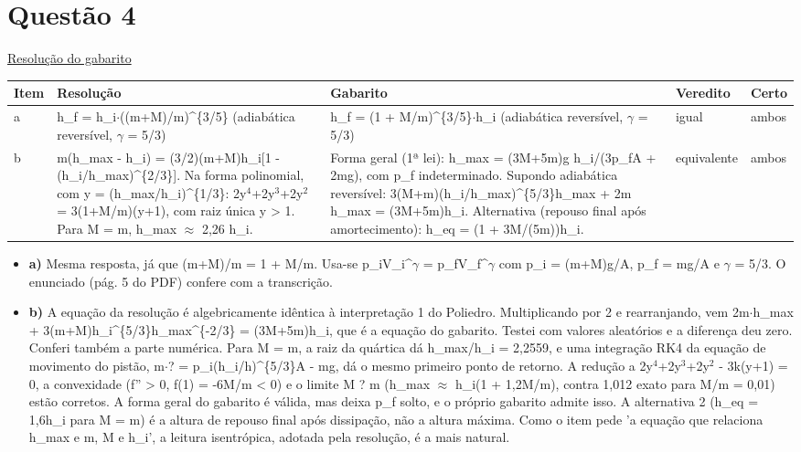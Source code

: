 \documentclass{article}%
\begin{document}
\section*{Questão 4}%
\href{https://poliedroresolve.sistemapoliedro.com.br/vestibulares/ita/2027/ita-2-fase-dia-3-22-10-2026-2-fase-dia-3/dissertativa-4-fisica-2-fase-dia-3-ita-2027}{Resolução do gabarito}\par\smallskip%
\begin{longtable}{@{}p{} p{} p{} p{} p{}@{}}\toprule Item & Resolução & Gabarito & Veredito & Certo \\ \midrule
a & h\_f = h\_i$\cdot$((m+M)/m)\^{}\{3/5\} (adiabática reversível, $\gamma$ = 5/3) & h\_f = (1 + M/m)\^{}\{3/5\}$\cdot$h\_i (adiabática reversível, $\gamma$ = 5/3) & igual & ambos \\
b & m(h\_max - h\_i) = (3/2)(m+M)h\_i{[}1 - (h\_i/h\_max)\^{}\{2/3\}{]}. Na forma polinomial, com y = (h\_max/h\_i)\^{}\{1/3\}: 2y$^{4}$+2y$^3$+2y$^2$ = 3(1+M/m)(y+1), com raiz única y > 1. Para M = m, h\_max $\approx$ 2,26 h\_i. & Forma geral (1ª lei): h\_max = (3M+5m)g h\_i/(3p\_fA + 2mg), com p\_f indeterminado. Supondo adiabática reversível: 3(M+m)(h\_i/h\_max)\^{}\{5/3\}h\_max + 2m h\_max = (3M+5m)h\_i. Alternativa (repouso final após amortecimento): h\_eq = (1 + 3M/(5m))h\_i. & equivalente & ambos \\
\bottomrule\end{longtable}%
\begin{itemize}%
\item%
\textbf{a)} Mesma resposta, já que (m+M)/m = 1 + M/m. Usa{-}se p\_iV\_i\^{}$\gamma$ = p\_fV\_f\^{}$\gamma$ com p\_i = (m+M)g/A, p\_f = mg/A e $\gamma$ = 5/3. O enunciado (pág. 5 do PDF) confere com a transcrição.%
\item%
\textbf{b)} A equação da resolução é algebricamente idêntica à interpretação 1 do Poliedro. Multiplicando por 2 e rearranjando, vem 2m$\cdot$h\_max + 3(m+M)h\_i\^{}\{5/3\}h\_max\^{}\{{-}2/3\} = (3M+5m)h\_i, que é a equação do gabarito. Testei com valores aleatórios e a diferença deu zero. Conferi também a parte numérica. Para M = m, a raiz da quártica dá h\_max/h\_i = 2,2559, e uma integração RK4 da equação de movimento do pistão, m$\cdot$? = p\_i(h\_i/h)\^{}\{5/3\}A - mg, dá o mesmo primeiro ponto de retorno. A redução a 2y$^{4}$+2y$^3$+2y$^2$ - 3k(y+1) = 0, a convexidade (f'' > 0, f(1) = -6M/m < 0) e o limite M ? m (h\_max $\approx$ h\_i(1 + 1,2M/m), contra 1,012 exato para M/m = 0,01) estão corretos. A forma geral do gabarito é válida, mas deixa p\_f solto, e o próprio gabarito admite isso. A alternativa 2 (h\_eq = 1,6h\_i para M = m) é a altura de repouso final após dissipação, não a altura máxima. Como o item pede 'a equação que relaciona h\_max e m, M e h\_i', a leitura isentrópica, adotada pela resolução, é a mais natural.%
\end{itemize}%
\end{document}

